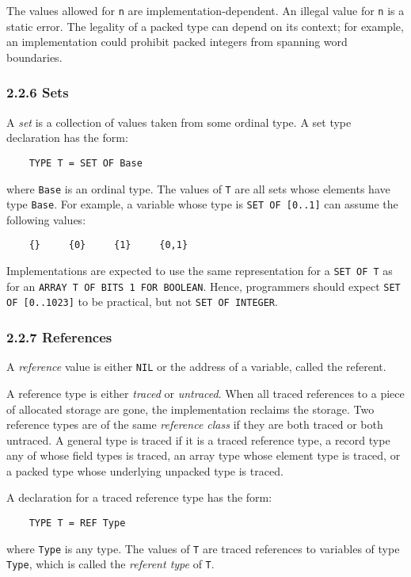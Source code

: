 \documentclass[10pt]{article}
\begin{document}
The values allowed for \verb|n| are implementation-dependent.  An illegal
value for \verb|n| is a static error.  The legality of a packed type can
depend on its context; for example, an implementation could prohibit packed
integers from spanning word boundaries.

\subsubsection*{2.2.6 Sets}

A \emph{set} is a collection of values taken from some ordinal type.  A set
type declaration has the form:
\begin{verbatim}
    TYPE T = SET OF Base
\end{verbatim}
where \verb|Base| is an ordinal type.  The values of \verb|T| are all sets
whose elements have type \verb|Base|.  For example, a variable whose type is
\verb|SET OF [0..1]| can assume the following values:
\begin{verbatim}
    {}     {0}     {1}     {0,1}
\end{verbatim}

Implementations are expected to use the same representation for a
\verb|SET OF T| as for an \texttt{ARRAY T OF BITS 1 FOR BOOLEAN}.  Hence,
programmers should expect \verb|SET OF [0..1023]| to be practical, but not
\verb|SET OF INTEGER|.

\subsubsection*{2.2.7 References}

A \emph{reference} value is either \verb|NIL| or the address of a variable,
called the referent.

A reference type is either \emph{traced} or \emph{untraced}.  When all traced
references to a piece of allocated storage are gone, the implementation
reclaims the storage.  Two reference types are of the same \emph{reference
  class} if they are both traced or both untraced.  A general type is traced
if it is a traced reference type, a record type any of whose field types is
traced, an array type whose element type is traced, or a packed type whose
underlying unpacked type is traced.

A declaration for a traced reference type has the form:
\begin{verbatim}
    TYPE T = REF Type
\end{verbatim}
where \verb|Type| is any type.  The values of \verb|T| are traced references
to variables of type \verb|Type|, which is called the \emph{referent type} of
\verb|T|.
\end{document}
